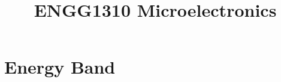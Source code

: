 \documentclass{article}
\title{ENGG1310 Microelectronics}
\begin{document}
\maketitle

\section{Energy Band}
\section{}
\section{}
\end{document}
